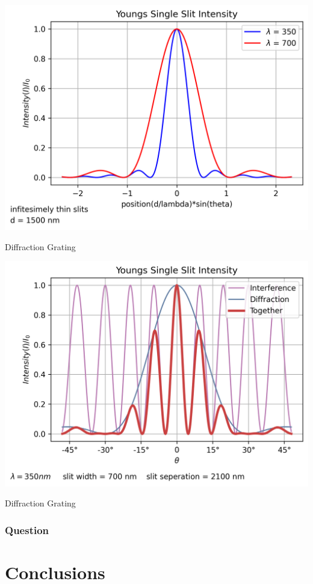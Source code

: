 \documentclass{report}
\begin{document}
\begin{table}[H]
    \centering
    \includegraphics[width = \textwidth]{plot3.png}
    \caption{Diffraction Grating}
\end{table}
\bigskip

\begin{table}[H]
    \centering
    \includegraphics[width = \textwidth]{plot4.png}
    \caption{Diffraction Grating}
\end{table}
\bigskip

\subsection*{Question}

\chapter{Conclusions}
\end{document}

